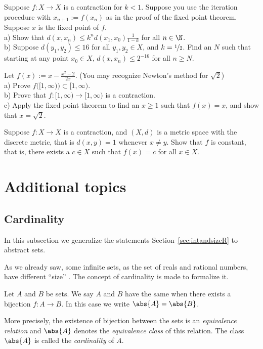 \documentclass[12pt]{book}
\begin{document}
\begin{exercise}
Suppose $f \colon X \to X$ is a contraction for $k < 1$.
Suppose you use the iteration
procedure with $x_{n+1} := f(x_n)$ as in the proof of the fixed point theorem.
Suppose $x$ is the fixed
point of $f$.\\
a) Show that $d(x,x_n) \leq k^n d(x_1,x_0) \frac{1}{1-k}$ for all $n \in \N$.\\
b) Suppose $d(y_1,y_2) \leq 16$ for all $y_1,y_2 \in X$, and $k=
\nicefrac{1}{2}$.
Find an $N$ such that starting at any point $x_0 \in X$, 
$d(x,x_n) \leq 2^{-16}$ for all $n \geq N$.
\end{exercise}

\begin{exercise}
Let $f(x) := x-\frac{x^2-2}{2x}$. (You may recognize Newton's method for
$\sqrt{2}$)\\
a) Prove $f\bigl([1,\infty)\bigr) \subset [1,\infty)$.\\
b) Prove that $f \colon [1,\infty) \to [1,\infty)$ is a contraction.\\
c) Apply the fixed point theorem to find an $x \geq 1$ such that
$f(x) = x$, and show that $x = \sqrt{2}$.
\end{exercise}

\begin{exercise}
Suppose $f \colon X \to X$ is a contraction, and $(X,d)$ is a metric space
with the discrete metric, that is $d(x,y) = 1$ whenever $x \not= y$.
Show that $f$ is constant, that is,
there exists a $c \in X$ such that $f(x) = c$ for all $x \in X$.
\end{exercise}

\chapter{Additional topics} \label{additional topics:chapter}

\section{Cardinality}

In this subsection we generalize the statements Section~\ref{sec:intandsizeR} to abstract sets.

As we already saw, some infinite sets, as the set of reals and rational numbers, have different ``size'' .  
The concept of cardinality is made to formalize it.  



\begin{defn}
Let $A$ and $B$ be sets.
We say $A$ and $B$ have the same
\emph{}
when there exists a bijection $f \colon A \to B$.
In this case we write $\abs{A}=\abs{B}$.

More precisely,
the existence of bijection between the sets is 
an \emph{equivalence relation} and $\abs{A}$ denotes the \emph{equivalence class} of this relation. 
The class $\abs{A}$ is called the \emph{cardinality} of $A$.
\end{defn}
\end{document}
